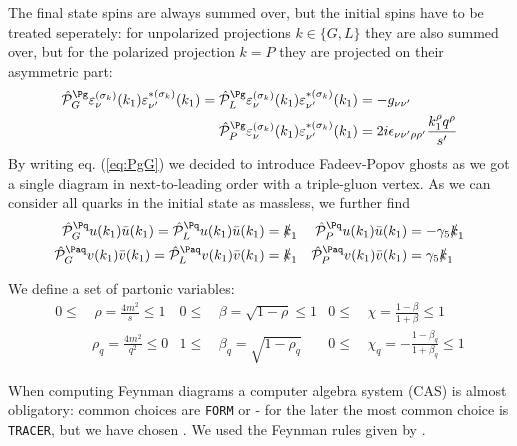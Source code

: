 The final state spins are always summed over, but the initial spins have to be treated seperately: for unpolarized projections $k\in\{G,L\}$ they are also summed over, but for the polarized projection $k=P$ they are projected on their asymmetric part:
\begin{align}
\hat {\mathcal P}^{\Pg}_{G}\varepsilon^{(\sigma_k)}_\nu(k_1)\varepsilon^{*(\sigma_k)}_{\nu'}(k_1) = \hat {\mathcal P}^{\Pg}_{L}\varepsilon^{(\sigma_k)}_\nu(k_1)\varepsilon^{*(\sigma_k)}_{\nu'}(k_1) &= -g_{\nu\nu'} \label{eq:PgG} \\
\hat {\mathcal P}^{\Pg}_{P}\varepsilon^{(\sigma_k)}_\nu(k_1)\varepsilon^{*(\sigma_k)}_{\nu'}(k_1) &= 2i\epsilon_{\nu\nu'\rho\rho'}\frac{k_1^{\rho}q^{\rho}}{s'}
\end{align}
By writing eq. (\ref{eq:PgG}) we decided to introduce Fadeev-Popov ghosts\cite{Bojak:2000eu} as we got a single diagram in next-to-leading order with a triple-gluon vertex. As we can consider all quarks in the initial state as massless, we further find
\begin{align}
\hat {\mathcal P}^{\Pq}_{G} u(k_1)\bar u(k_1) = \hat {\mathcal P}^{\Pq}_{L} u(k_1)\bar u(k_1) &= \slashed k_1
&\hat {\mathcal P}^{\Pq}_{P} u(k_1)\bar u(k_1) &= -\gamma_5\slashed k_1\\
\hat {\mathcal P}^{\Paq}_{G} v(k_1)\bar v(k_1) = \hat {\mathcal P}^{\Paq}_{L} v(k_1)\bar v(k_1) &= \slashed k_1
&\hat {\mathcal P}^{\Paq}_{P} v(k_1)\bar v(k_1) &= \gamma_5\slashed k_1
\end{align}

We define a set of partonic variables:
\begin{align}
0\leq&\,\rho = \frac {4m^2} s\leq 1 &0\leq&\,\beta = \sqrt{1-\rho}\leq 1 &0\leq&\,\chi = \frac{1-\beta}{1+\beta}\leq 1\\
&\rho_q = \frac {4m^2} {q^2}\leq 0 &1\leq&\,\beta_q = \sqrt{1-\rho_q} &0\leq&\,\chi_q = -\frac{1-\beta_q}{1+\beta_q}\leq 1
\end{align}

When computing Feynman diagrams a computer algebra system (CAS) is almost obligatory: common choices are \texttt{FORM}\cite{Vermaseren:2000nd} or \MMa\cite{Mathematica} - for the later the most common choice is \texttt{TRACER}\cite{Tracer}, but we have chosen \HEPMath\cite{wiebusch_hepmath_2015}. We used the Feynman rules given by \cite{Leader}.
